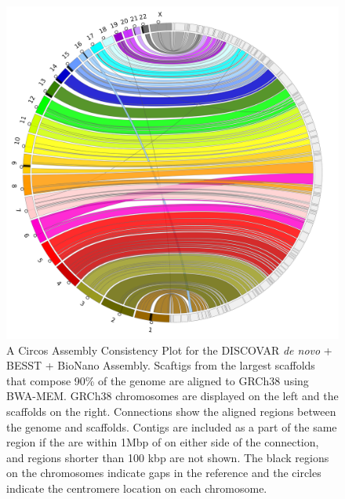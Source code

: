 \documentclass[
  12pt,
  oneside,
  openany]{book}
\begin{document}
\begin{appendices}
\begin{figure}
\hypertarget{fig:jup5}{%
\centering
\includegraphics{abyss2-appendix/discovardenovo_BESST_bionano.png}
\caption[A Circos Assembly Consistency Plot for the DISCOVAR \emph{de novo} + BESST + BioNano Assembly.]{A Circos Assembly Consistency Plot for the DISCOVAR \emph{de novo} + BESST + BioNano Assembly. Scaftigs from the largest scaffolds that compose 90\% of the genome are aligned to GRCh38 using BWA-MEM. GRCh38 chromosomes are displayed on the left and the scaffolds on the right. Connections show the aligned regions between the genome and scaffolds. Contigs are included as a part of the same region if the are within 1Mbp of on either side of the connection, and regions shorter than 100 kbp are not shown. The black regions on the chromosomes indicate gaps in the reference and the circles indicate the centromere location on each chromosome.}\label{fig:jup5}
}
\end{figure}


\end{appendices}
\end{document}
